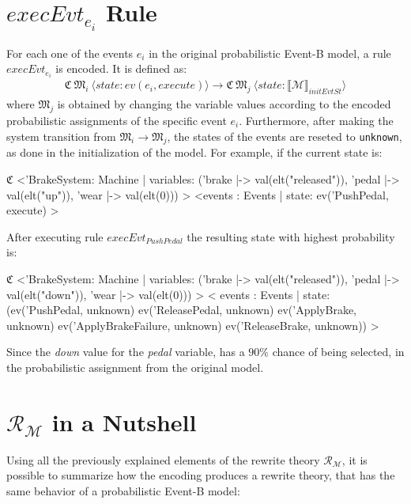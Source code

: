 \section{$execEvt_{e_i}$ Rule}
For each one of the events $e_i$ in the original probabilistic Event-B model, a rule $execEvt_{e_i}$ is encoded. It is defined as: 
\begin{align*}
    \mathfrak{C} \ \mathfrak{M}_i \ \langle state: ev(e_i, execute) \rangle \rightarrow \mathfrak{C} \ \mathfrak{M}_j \ \langle state: \llbracket \mathscr{M} \rrbracket_{initEvtSt} \rangle
\end{align*}
where $\mathfrak{M}_j$ is obtained by changing the variable values according to the encoded probabilistic assignments of the specific event $e_i$. Furthermore, after making the system transition from $\mathfrak{M}_i \rightarrow \mathfrak{M}_j$, the states of the events are reseted to \texttt{unknown}, as done in the initialization of the model.
For example, if the current state is:
\begin{maude}

$\mathfrak{C}$ <'BrakeSystem: Machine | variables: ('brake |-> val(elt("released")), 
                                        'pedal |-> val(elt("up")), 
                                        'wear |-> val(elt(0))) >
  <events : Events | state: ev('PushPedal, execute) >
\end{maude}
After executing rule $execEvt_{PushPedal}$ the resulting state with highest probability is:
\begin{maude}

$\mathfrak{C}$ <'BrakeSystem: Machine | variables: ('brake |-> val(elt("released")), 
                                        'pedal |-> val(elt("down")), 
                                        'wear |-> val(elt(0))) >
  < events : Events | state: (ev('PushPedal, unknown) 
                              ev('ReleasePedal, unknown) 
                              ev('ApplyBrake, unknown) 
                              ev('ApplyBrakeFailure, unknown) 
                              ev('ReleaseBrake, unknown)) >
\end{maude}
Since the \textit{down} value for the \textit{pedal} variable, has a $90\%$ chance of being selected, in the probabilistic assignment from the original model.

\section{$\mathscr{R}_\mathscr{M}$ in a Nutshell}
Using all the previously explained elements of the rewrite theory $\mathscr{R}_\mathscr{M}$, it is possible to summarize how the encoding produces a rewrite theory, that has the same behavior of a probabilistic Event-B model: 


